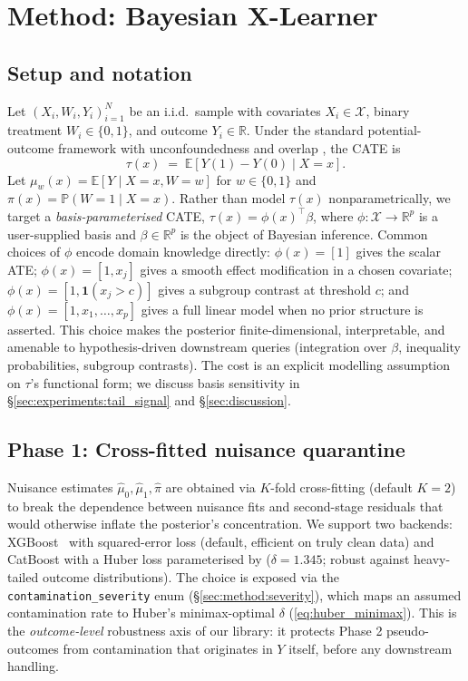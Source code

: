 \section{Method: Bayesian X-Learner}
\label{sec:method}

\subsection{Setup and notation}
Let $(X_i, W_i, Y_i)_{i=1}^N$ be an i.i.d.~sample with covariates
$X_i \in \mathcal{X}$, binary treatment $W_i \in \{0, 1\}$, and
outcome $Y_i \in \mathbb{R}$. Under the standard potential-outcome
framework with unconfoundedness and overlap
\citep{hill2011bayesian}, the CATE is
\begin{equation}
  \tau(x) \;=\; \mathbb{E}[Y(1) - Y(0) \mid X = x].
\end{equation}
Let $\mu_w(x) = \mathbb{E}[Y \mid X = x, W = w]$ for $w \in \{0, 1\}$
and $\pi(x) = \mathbb{P}(W = 1 \mid X = x)$. Rather than model
$\tau(x)$ nonparametrically, we target a \emph{basis-parameterised}
CATE, $\tau(x) = \phi(x)^\top \beta$, where $\phi : \mathcal{X}
\rightarrow \mathbb{R}^p$ is a user-supplied basis and
$\beta \in \mathbb{R}^p$ is the object of Bayesian inference.
Common choices of $\phi$ encode domain knowledge directly:
$\phi(x) = [1]$ gives the scalar ATE; $\phi(x) = [1, x_j]$ gives a
smooth effect modification in a chosen covariate; $\phi(x) =
[1, \mathbf{1}(x_j > c)]$ gives a subgroup contrast at threshold
$c$; and $\phi(x) = [1, x_1, \dots, x_p]$ gives a full linear model
when no prior structure is asserted. This choice makes the posterior
finite-dimensional, interpretable, and amenable to hypothesis-driven
downstream queries (integration over $\beta$, inequality probabilities,
subgroup contrasts). The cost is an explicit modelling assumption on
$\tau$'s functional form; we discuss basis sensitivity in
\S\ref{sec:experiments:tail_signal} and
\S\ref{sec:discussion}.

\subsection{Phase 1: Cross-fitted nuisance quarantine}
\label{sec:method:phase1}
Nuisance estimates $\hat{\mu}_0, \hat{\mu}_1, \hat{\pi}$ are obtained
via $K$-fold cross-fitting (default $K = 2$) to break the dependence
between nuisance fits and second-stage residuals that would otherwise
inflate the posterior's concentration. We support two backends:
XGBoost~\citep{chen2016xgboost} with squared-error loss (default,
efficient on truly clean data) and CatBoost with a Huber loss
parameterised by ($\delta = 1.345$; robust against heavy-tailed outcome
distributions). The choice is exposed via the
\texttt{contamination\_severity} enum
(\S\ref{sec:method:severity}), which maps an assumed
contamination rate to Huber's minimax-optimal $\delta$
(\eqref{eq:huber_minimax}). This is the \emph{outcome-level}
robustness axis of our library: it protects Phase 2 pseudo-outcomes
from contamination that originates in $Y$ itself, before any
downstream handling.

